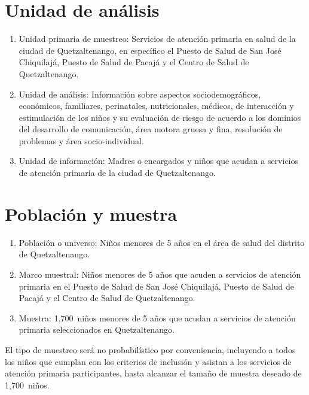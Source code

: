 \documentclass[11pt,letterpaper]{report}
\newcommand{\tiempito}{durante 2,025}
\newcommand{\muestradeseada}{1,700}
\begin{document}
\section{Unidad de análisis}
	\begin{enumerate}
		\item Unidad primaria de muestreo: Servicios de atención primaria en
		salud de la ciudad de Quetzaltenango, en específico el Puesto de
		Salud de San José Chiquilajá, Puesto de Salud de Pacajá y el Centro de
		Salud de Quetzaltenango.
		\item Unidad de análisis: Información sobre aspectos sociodemográficos,
		económicos, familiares, perinatales, nutricionales, médicos, de
		interacción y estimulación de los niños y su evaluación de riesgo de
		acuerdo a los dominios del desarrollo de comunicación, área motora
		gruesa y fina, resolución de problemas y área socio-individual.
		\item Unidad de información: Madres o encargados y niños que acudan a
		servicios de atención primaria de la ciudad de Quetzaltenango.
	\end{enumerate}

\section{Población y muestra}
	\begin{enumerate}
		\item Población o universo: Niños menores de 5 años en el área de salud
		del distrito de Quetzaltenango.
		\item Marco muestral: Niños menores de 5 años que acuden a servicios de
		atención primaria en el Puesto de Salud de San José Chiquilajá, Puesto
		de Salud de Pacajá y el Centro de Salud de Quetzaltenango. %
		\item Muestra: \muestradeseada\ niños menores de 5 años que acudan a
		servicios de atención primaria seleccionados en Quetzaltenango.
	\end{enumerate}

El tipo de muestreo será no probabilístico por conveniencia, incluyendo a todos
los niños que cumplan con los criterios de inclusión y asistan a los servicios
de atención primaria participantes, hasta alcanzar el tamaño
de muestra deseado de \muestradeseada\ niños.
\end{document}
